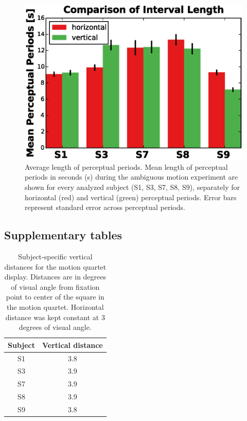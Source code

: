 \begin{figure}[htbp!]
\centering
\includegraphics[width=\textwidth]{figures/chapter_03_SI/figS13.eps}
\caption{Average length of perceptual periods. Mean length of perceptual periods in seconds (s) during the ambiguous motion experiment are shown for every analyzed subject (S1, S3, S7, S8, S9), separately for horizontal (red) and vertical (green) perceptual periods. Error bars represent standard error across perceptual periods.}
\label{fig:figF_behRes}
\end{figure}

\clearpage
\subsection{Supplementary tables}

\begin{table}[htbp!]
\centering
\caption{Subject-specific vertical distances for the motion quartet display. Distances are in degrees of visual angle from fixation point to center of the square in the motion quartet. Horizontal distance was kept constant at 3 degrees of visual angle.}
\begin{tabular}{cc}
\\
\toprule
Subject & Vertical distance \\
\midrule
S1 & 3.8 \\
S3 & 3.9 \\
S7 & 3.9 \\
S8 & 3.9 \\
S9 & 3.8 \\
\bottomrule
\end{tabular}
\label{tab:distances}
\end{table}


